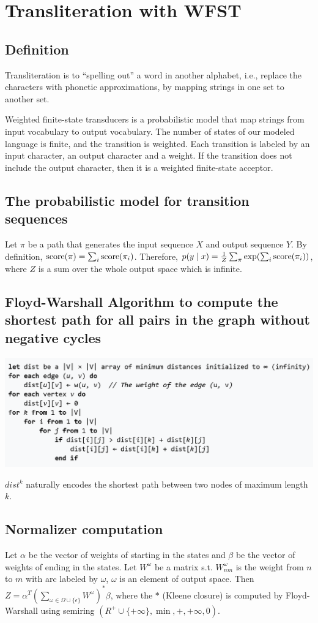 \section{Transliteration with WFST}

\subsection*{Definition}

Transliteration is to ``spelling out'' a word in another alphabet, i.e., replace the characters with phonetic approximations, by mapping strings in one set to another set.

Weighted finite-state transducers is a probabilistic model that map strings from input vocabulary to output vocabulary. The number of states of our modeled language is finite, and the transition is weighted. Each transition is labeled by an input character, an output character and a weight. If the transition does not include the output character, then it is a weighted finite-state acceptor.

\subsection*{The probabilistic model for transition sequences}
Let $\pi$ be a path that generates the input sequence $X$ and output sequence $Y$. By definition, $\text{score}(\pi)=\sum_i \text{score}(\pi_i)$. Therefore, $p(y\mid x)=\frac{1}{Z} \sum_\pi \exp(\sum_i \text{score}(\pi_i))$, where $Z$ is a sum over the whole output space which is infinite.

\subsection*{Floyd-Warshall Algorithm to compute the shortest path for all pairs in the graph without negative cycles}

\includegraphics[width=.24\textwidth]{img/Floyd_Warshall.png}

$dist^k$ naturally encodes the shortest path between two nodes of maximum length $k$.

\subsection*{Normalizer computation}

Let $\mathbb{\alpha}$ be the vector of weights of starting in the states and $\mathbb{\beta}$ be the vector of weights of ending in the states. Let $W^{\omega}$ be a matrix s.t. $W_{nm}^{\omega}$ is the weight from $n$ to $m$ with arc labeled by $\omega$, $\omega$ is an element of output space. Then $Z=\alpha^T (\sum_{\omega\in \Omega\cup \{\epsilon\}} W^{\omega})^* \beta$, where the $*$ (Kleene closure) is computed by Floyd-Warshall using semiring $(R^+\cup\{+\infty\}, \min, +, +\infty, 0)$.